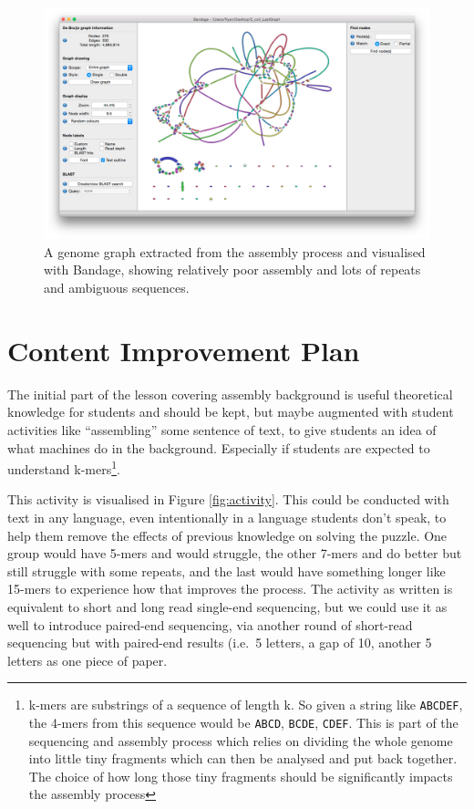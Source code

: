 \documentclass[paper=a4,justified,a4paper]{tufte-handout}
\begin{document}
\begin{figure}
\centering
\includegraphics{./bandage_gui.png}
\caption{A genome graph extracted from the assembly process and
visualised with Bandage, showing relatively poor assembly and lots of
repeats and ambiguous sequences.\label{fig:bandage}}
\end{figure}

\hypertarget{content-improvement-plan}{%
\section{Content Improvement Plan}\label{content-improvement-plan}}

The initial part of the lesson covering assembly background is useful
theoretical knowledge for students and should be kept, but maybe
augmented with student activities like ``assembling'' some sentence of
text, to give students an idea of what machines do in the background.
Especially if students are expected to understand k-mers\footnote{k-mers
  are substrings of a sequence of length k. So given a string like
  \texttt{ABCDEF}, the 4-mers from this sequence would be \texttt{ABCD},
  \texttt{BCDE}, \texttt{CDEF}. This is part of the sequencing and
  assembly process which relies on dividing the whole genome into little
  tiny fragments which can then be analysed and put back together. The
  choice of how long those tiny fragments should be significantly
  impacts the assembly process}.

This activity is visualised in Figure \ref{fig:activity}. This could be
conducted with text in any language, even intentionally in a language
students don't speak, to help them remove the effects of previous
knowledge on solving the puzzle. One group would have 5-mers and would
struggle, the other 7-mers and do better but still struggle with some
repeats, and the last would have something longer like 15-mers to
experience how that improves the process. The activity as written is
equivalent to short and long read single-end sequencing, but we could
use it as well to introduce paired-end sequencing, via another round of
short-read sequencing but with paired-end results (i.e.~5 letters, a gap
of 10, another 5 letters as one piece of paper.
\end{document}
